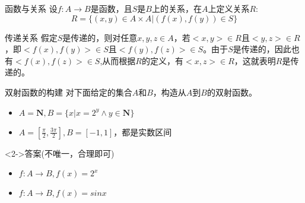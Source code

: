 \documentclass[10pt,aspectratio=43,mathserif,table]{beamer}
\begin{document}
\begin{frame}{函数与关系}
	设$f:A\rightarrow B$是函数，且$S$是$B$上的关系，在$A$上定义关系$R$:$$R=\{(x,y)\in A\times A|(f(x),f(y))\in S\}$$
	
	\begin{block}{传递关系}
		假定$S$是传递的，则对任意$x,y,z\in A$，若$<x,y>\in R$且$<y,z>\in R$，即$<f(x),f(y)>\in S$且$<f(y),f(z)>\in S$。由于$S$是传递的，因此也有$<f(x),f(z)>\in S$,从而根据$R$的定义，有$<x,z>\in R$，这就表明$R$是传递的。
	\end{block}
	
\end{frame}

\begin{frame}{双射函数的构建}
	对下面给定的集合$A$和$B$，构造从$A$到$B$的双射函数。
	\begin{itemize}
		\item<0-> $A = \mathbf{N},B=\{x|x=2^{y}\wedge y\in \mathbf{N}\}$
		\item<0-> $A=[\frac{\pi}{2},\frac{3\pi}{2}],B=[-1,1]$，都是实数区间
	\end{itemize}

	\begin{block}<2->{答案(不唯一，合理即可)}
		\begin{itemize}
			\item $f:A\rightarrow B,f(x)=2^{x}$
			\item $f:A\rightarrow B,f(x)=sinx$
		\end{itemize}
		
	\end{block}
\end{frame}
\end{document}
